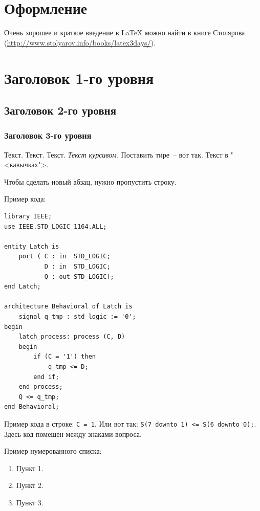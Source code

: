 \section{Оформление}

Очень хорошее и краткое введение в LaTeX можно найти в книге Столярова (\href{url}{http://www.stolyarov.info/books/latex3days/}).

\section{Заголовок 1-го уровня}
\subsection{Заголовок 2-го уровня}
\subsubsection{Заголовок 3-го уровня}

Текст. Текст. Текст. \emph{Текст курсивом.} Поставить тире~-- вот так. Текст в "<кавычках">.

Чтобы сделать новый абзац, нужно пропустить строку.

Пример кода:

\begin{Code}
\begin{lstlisting}
library IEEE;
use IEEE.STD_LOGIC_1164.ALL;

entity Latch is
    port ( C : in  STD_LOGIC;
           D : in  STD_LOGIC;
           Q : out STD_LOGIC);
end Latch;

architecture Behavioral of Latch is
    signal q_tmp : std_logic := '0';
begin
    latch_process: process (C, D)
    begin
        if (C = '1') then
            q_tmp <= D;
        end if;
    end process;
    Q <= q_tmp;
end Behavioral;
\end{lstlisting}
\end{Code}

Пример кода в строке: \lstinline?С = 1?. Или вот так: \lstinline?S(7 downto 1) <= S(6 downto 0);?. Здесь код помещен между знаками вопроса.

Пример нумерованного списка:

\begin{enumerate}
\item Пункт 1.
\item Пункт 2.
\item Пункт 3.
\end{enumerate}


